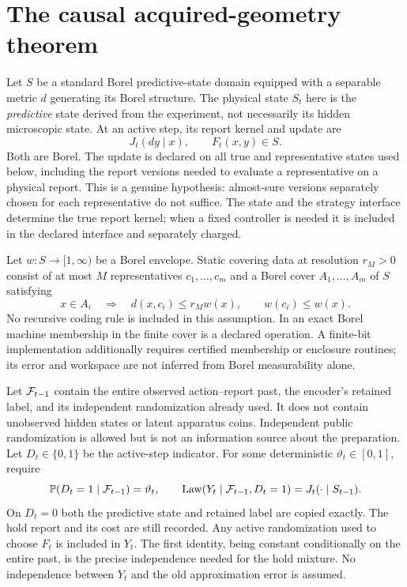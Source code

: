 \section{The causal acquired-geometry theorem}\label{sec:transfer}
Let $S$ be a standard Borel predictive-state domain equipped with a separable metric $d$ generating its Borel structure. The physical state $S_t$ here is the \emph{predictive} state derived from the experiment, not necessarily its hidden microscopic state. At an active step, its report kernel and update are
\[
 J_t(dy\mid x),\qquad F_t(x,y)\in S.
\]
Both are Borel. The update is declared on all true and representative states used below, including the report versions needed to evaluate a representative on a physical report. This is a genuine hypothesis: almost-sure versions separately chosen for each representative do not suffice. The state and the strategy interface determine the true report kernel; when a fixed controller is needed it is included in the declared interface and separately charged.

Let $w:S\to[1,\infty)$ be a Borel envelope. Static covering data at resolution $r_M>0$ consist of at most $M$ representatives $c_1,\ldots,c_m$ and a Borel cover $A_1,\ldots,A_m$ of $S$ satisfying
\begin{equation}\label{eq:inward}
 x\in A_i\quad\Longrightarrow\quad
 d(x,c_i)\le r_M w(x),\qquad w(c_i)\le w(x).
\end{equation}
No recursive coding rule is included in this assumption. In an exact Borel machine membership in the finite cover is a declared operation. A finite-bit implementation additionally requires certified membership or enclosure routines; its error and workspace are not inferred from Borel measurability alone.

Let $\mathcal F_{t-1}$ contain the entire observed action--report past, the encoder's retained label, and its independent randomization already used. It does not contain unobserved hidden states or latent apparatus coins. Independent public randomization is allowed but is not an information source about the preparation. Let $D_t\in\{0,1\}$ be the active-step indicator. For some deterministic $\vartheta_t\in[0,1]$, require
\begin{equation}\label{eq:conditional}
 \mathbb P(D_t=1\mid\mathcal F_{t-1})=\vartheta_t,\qquad
 \operatorname{Law}(Y_t\mid\mathcal F_{t-1},D_t=1)=J_t(\cdot\mid S_{t-1}).
\end{equation}
On $D_t=0$ both the predictive state and retained label are copied exactly. The hold report and its cost are still recorded. Any active randomization used to choose $F_t$ is included in $Y_t$. The first identity, being constant conditionally on the entire past, is the precise independence needed for the hold mixture. No independence between $Y_t$ and the old approximation error is assumed.

